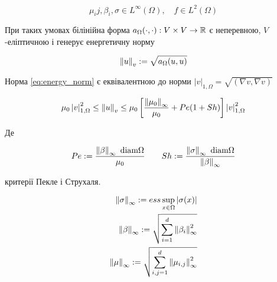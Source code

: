 \begin{equation}
	\mu_ij, \beta_i, \sigma \in L^\infty(\Omega), \quad f \in L^2(\Omega)
\end{equation}

При таких умовах білінійна форма $a_\Omega (\cdot,\cdot): V \times V  \to \mathbb{R}$ є неперевною, $V$-еліптичною і генерує енергетичну норму

\begin{equation}\label{eq:energy_norm}
	\left\lVert u\right\rVert_v := \sqrt{a_\Omega(u,u)}
\end{equation}

\newcommand{\vonenorm}{\left|v\right|_{1,\Omega}}

Норма \ref{eq:energy_norm} є еквівалентною до норми $\vonenorm = \sqrt{(\nabla v, \nabla v)}$

\newcommand{\infnorm}[1]{\norm{#1}_\infty}

\begin{equation}\label{eq:norm_equivalence}
	\mu_0 \vonenorm^2 \le \norm{u}_v \le
		\mu_0
			\left[
				\frac{\norm{\mu_0}_\infty}{\mu_0}+Pe(1+Sh)
			\right]
		\vonenorm^2
\end{equation}

Де

\begin{equation}
	Pe:= \frac{\infnorm{\beta} \text{ diam} \Omega}{\mu_0} \qquad
	Sh:= \frac{\infnorm{\sigma} \text{ diam} \Omega}{\infnorm{\beta}}
\end{equation}

критерії Пекле і Струхаля.

\begin{equation}
	\begin{split}
		\infnorm{\sigma} := ess \sup \limits_{x \in \Omega} |\sigma(x)| \\
		\infnorm{\beta} := \sqrt{\sum \limits_{i=1}^d \infnorm{\beta_i}^2} \\
		\infnorm{\mu} := \sqrt{\sum \limits_{i,j=1}^d \infnorm{\mu_{i,j}}^2}
	\end{split}
\end{equation}

\undef{\vonenorm}
